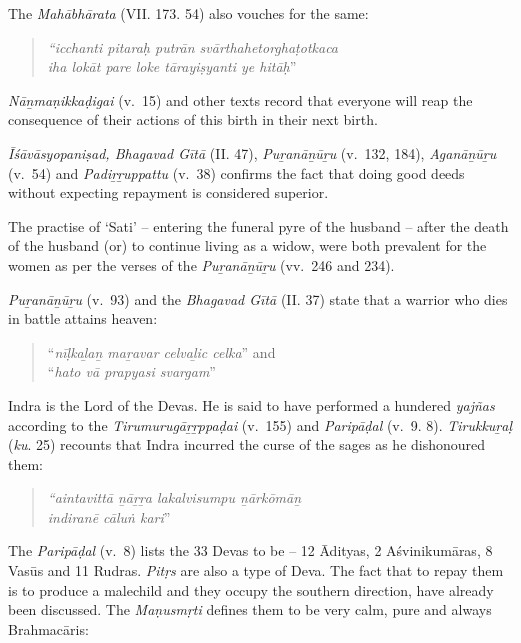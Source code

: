 The \textit{Mahābhārata} (VII. 173. 54) also vouches for the same:

\begin{quote}
\textit{“icchanti pitaraḥ putrān svārthahetorghaṭotkaca}\\\textit{iha lokāt pare loke tārayiṣyanti ye hitāḥ}”
\end{quote}

\textit{Nāṉmaṇikkaḍigai} (v.~15) and other texts record that everyone will reap the consequence of their actions of this birth in their next birth.

\textit{Īśāvāsyopaniṣad, Bhagavad Gītā} (II. 47), \textit{Puṟanāṉūṟu} (v.~132, 184), \textit{Aganāṉūṟu \\} (v.~54) and \textit{Padiṟṟuppattu} (v.~38) confirms the fact that doing good deeds without expecting repayment is considered superior.

The practise of ‘Sati’ – entering the funeral pyre of the husband – after the death of the husband (or) to continue living as a widow, were both prevalent for the women as per the verses of the \textit{Puṟanāṉūṟu} (vv.~246 and 234).

\textit{Puṟanāṉūṟu} (v.~93) and the \textit{Bhagavad Gītā} (II. 37) state that a warrior who dies in battle attains heaven:

\begin{quote}
“\textit{nīḷkaḻaṉ maṟavar celvaḻic celka}” and \\ “\textit{hato vā prapyasi svargam}”
\end{quote}

Indra is the Lord of the Devas. He is said to have performed a hundered \textit{yajñas} according to the \textit{Tirumurugāṟṟppaḍai} (v.~155) and \textit{Paripāḍal} (v.~9. 8). \textit{Tirukkuṟaḷ} (\textit{ku}. 25) recounts that Indra incurred the curse of the sages as he dishonoured them:

\begin{quote}
\textit{“aintavittā ṉāṟṟa lakalvisumpu ṉārkōmāṉ}\\\textit{indiranē cāluṅ kari}”
\end{quote}

The \textit{Paripāḍal} (v.~8) lists the 33 Devas to be – 12 Ādityas, 2 Aśvinikumāras, 8 Vasūs and 11 Rudras. \textit{Pitṛs} are also a type of Deva. The fact that to repay them is to produce a malechild and they occupy the southern direction, have already been discussed. The \textit{Maṇusmṛti} defines them to be very calm, pure and always Brahmacāris:


